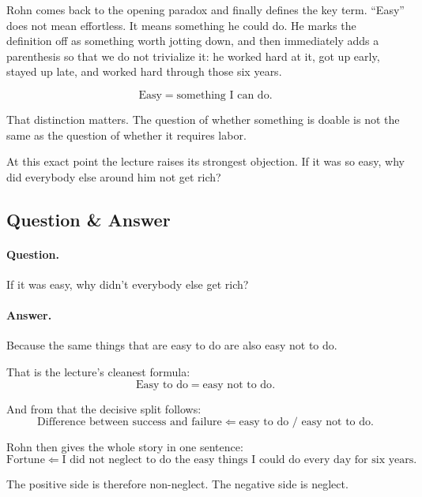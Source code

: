 Rohn comes back to the opening paradox and finally defines the key term. ``Easy'' does not mean effortless. It means something he could do. He marks the definition off as something worth jotting down, and then immediately adds a parenthesis so that we do not trivialize it: he worked hard at it, got up early, stayed up late, and worked hard through those six years.

\begin{equation}
\text{Easy}=\text{something I can do}.
\end{equation}

That distinction matters. The question of whether something is doable is not the same as the question of whether it requires labor.

At this exact point the lecture raises its strongest objection. If it was so easy, why did everybody else around him not get rich?

\subsection{Question \& Answer}

\paragraph{Question.} If it was easy, why didn't everybody else get rich?

\paragraph{Answer.} Because the same things that are easy to do are also easy not to do.

That is the lecture's cleanest formula:
\begin{equation}
\text{Easy to do}=\text{easy not to do}.
\end{equation}

And from that the decisive split follows:
\begin{equation}
\text{Difference between success and failure}
\Longleftarrow
\text{easy to do / easy not to do}.
\end{equation}

Rohn then gives the whole story in one sentence:
\begin{equation}
\text{Fortune}
\Longleftarrow
\text{I did not neglect to do the easy things I could do every day for six years}.
\end{equation}

The positive side is therefore non-neglect. The negative side is neglect.

